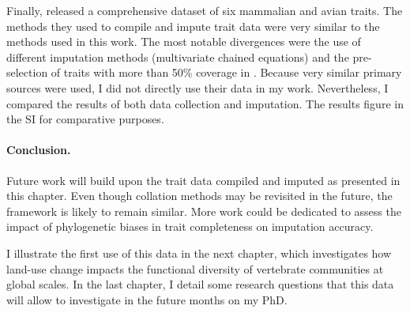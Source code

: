 Finally, \citet{Cooke2019} released a comprehensive dataset of six mammalian and avian traits. The methods they used to compile and impute trait data were very similar to the methods used in this work. The most notable divergences were the use of different imputation methods (multivariate chained equations) and the pre-selection of traits with more than 50\% coverage in \citet{Cooke2019}. Because very similar primary sources were used, I did not directly use their data in my work. Nevertheless, I compared the results of both data collection and imputation. The results figure in the SI for comparative purposes.
 
\paragraph{Conclusion.}
Future work will build upon the trait data compiled and imputed as presented in this chapter. Even though collation methods may be revisited in the future, the framework is likely to remain similar. More work could be dedicated to assess the impact of phylogenetic biases in trait completeness on imputation accuracy.

I illustrate the first use of this data in the next chapter, which investigates how land-use change impacts the functional diversity of vertebrate communities at global scales. In the last chapter, I detail some research questions that this data will allow to investigate in the future months on my PhD.
